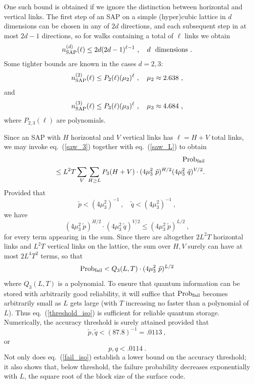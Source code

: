 One such bound is obtained if we ignore the distinction between horizontal and
vertical links. The first step of an SAP on a simple (hyper)cubic lattice in
$d$ dimensions can be chosen in any of $2d$ directions, and each subsequent
step in at most $2d-1$ directions, so for walks containing a total of $\ell$ links we obtain
\begin{equation}
n_{\rm SAP}^{(d)}(\ell)\le 2d(2d-1)^{\ell-1}~,\quad d~~{\rm dimensions}~.
\end{equation}
Some tighter bounds are known \cite{vanderzande,madras} in the cases $d=2,3$:
\begin{equation}
\label{saw_2}
n_{\rm SAP}^{(2)}(\ell)\le P_2(\ell)(\mu_2)^\ell~,\quad \mu_2\approx 2.638~,
\end{equation}
and
\begin{equation}
\label{saw_3}
n_{\rm SAP}^{(3)}(\ell)\le P_3(\ell)(\mu_3)^\ell~,\quad \mu_3\approx 4.684~,
\end{equation}
where $P_{2,3}(\ell)$ are polynomials.

Since an SAP with $H$ horizontal and $V$ vertical links has $\ell=H+V$ total
links, we may invoke eq.~(\ref{saw_3}) together with eq.~(\ref{saw_L}) to
obtain
\begin{eqnarray}
&&{\rm Prob}_{\rm fail}\nonumber\\
&&\le L^2 T \sum_{V}\sum_{H\ge L} P_3(H+V) \cdot(4\mu_3^2 ~\tilde p)^{H/2}
(4\mu_3^2 ~\tilde q)^{V/2}.
\end{eqnarray}
Provided that
\begin{equation}
\label{threshold_iso}
\tilde p< (4\mu_3^2)^{-1}~,\quad \tilde q < (4\mu_3^2)^{-1}~,
\end{equation}
we have
\begin{equation}
(4\mu_3^2 ~ \tilde p)^{H/2}\cdot (4\mu_3^2 ~ \tilde q)^{V/2} \le (4\mu_3^2 ~\tilde p)^{L/2}~,
\end{equation}
for every term appearing in the sum. Since there are altogether $2L^2 T$
horizontal links and $L^2 T$ vertical links on the lattice, the sum over
${H,V}$ surely can have at most $2L^4T^2$ terms, so that
\begin{equation}
\label{fail_iso}
{\rm Prob}_{\rm fail} < Q_3(L,T)\cdot (4\mu_3^2 ~\tilde p)^{L/2}
\end{equation}
where $Q_3(L,T)$ is a polynomial. 
To ensure that quantum information can be stored with
arbitrarily good reliability, it will suffice that ${\rm Prob}_{\rm fail}$ becomes arbitrarily small as $L$ gets large (with $T$ increasing no faster than a polynomial of $L$).
Thus  eq.~({\ref{threshold_iso}}) is sufficient for reliable quantum storage.
Numerically, the accuracy threshold is surely attained provided that
\begin{equation}
\tilde p, \tilde q < (87.8)^{-1}= .0113~,
\end{equation}
or
\begin{equation}
\label{threshold_iso_num}
p, q <  .0114~.
\end{equation}
Not only does eq.~(\ref{fail_iso}) establish a lower bound on the accuracy threshold; it also shows that, below threshold, the failure probability decreases exponentially with $L$, the square root of the block size of the surface code. 

